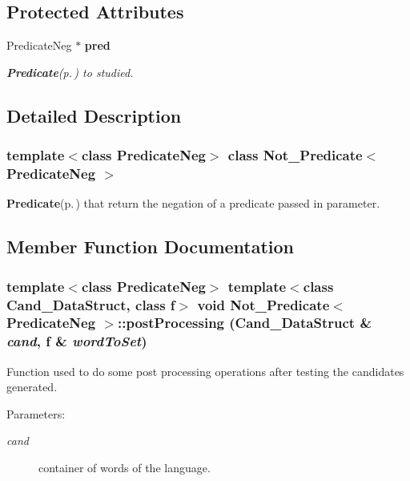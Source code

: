 \subsection*{Protected Attributes}
\begin{CompactItemize}
\item 
Predicate\-Neg $\ast$ {\bf pred}\label{class_not___predicate_2dff4f17e32eeae61ee949f76e542ff5}

\begin{CompactList}\small\item\em {\bf Predicate}{\rm (p.\,\pageref{class_predicate})} to studied. \item\end{CompactList}\end{CompactItemize}


\subsection{Detailed Description}
\subsubsection*{template$<$class Predicate\-Neg$>$ class Not\_\-Predicate$<$ Predicate\-Neg $>$}

{\bf Predicate}{\rm (p.\,\pageref{class_predicate})} that return the negation of a predicate passed in parameter. 



\subsection{Member Function Documentation}
\subsubsection{\setlength{\rightskip}{0pt plus 5cm}template$<$class Predicate\-Neg$>$ template$<$class Cand\_\-Data\-Struct, class f$>$ void {\bf Not\_\-Predicate}$<$ Predicate\-Neg $>$::post\-Processing (Cand\_\-Data\-Struct \& {\em cand}, f \& {\em word\-To\-Set})\hspace{0.3cm}{\tt  [inline]}}\label{class_not___predicate_849572f82b1b8a34b9b71459c9da24be}


Function used to do some post processing operations after testing the candidates generated. 

\begin{Desc}
\item[Parameters:]
\begin{description}
\item[{\em cand}]container of words of the language. \end{description}
\end{Desc}
